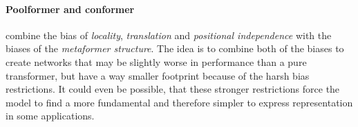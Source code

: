 \paragraph{Poolformer and conformer} \cite{metaformerPaper} combine the bias of \emph{locality}, \emph{translation} and \emph{positional independence} with the biases of the \emph{metaformer structure}.
The idea is to combine both of the biases to create networks that may be slightly worse in performance than a pure transformer, but have a way smaller footprint because of the harsh bias restrictions. 
It could even be possible, that these stronger restrictions force the model to find a more fundamental and therefore simpler to express representation in some applications.
